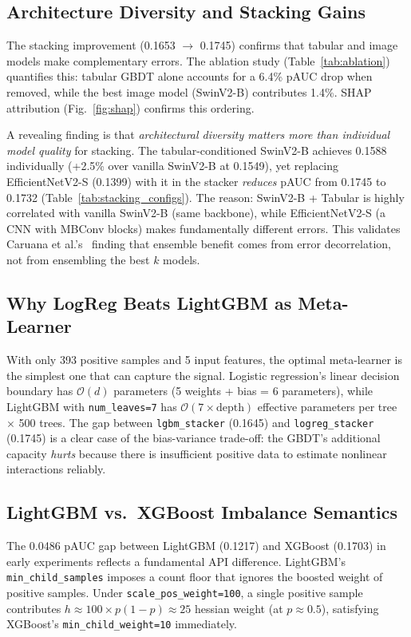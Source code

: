 \documentclass[conference]{IEEEtran}
\begin{document}
\subsection{Architecture Diversity and Stacking Gains}

The stacking improvement (0.1653 $\to$ 0.1745) confirms that
tabular and image models make complementary errors.
The ablation study (Table~\ref{tab:ablation}) quantifies this:
tabular GBDT alone accounts for a 6.4\% pAUC drop when removed,
while the best image model (SwinV2-B) contributes 1.4\%.
SHAP attribution (Fig.~\ref{fig:shap}) confirms this ordering.

A revealing finding is that \emph{architectural diversity matters
more than individual model quality} for stacking.
The tabular-conditioned SwinV2-B achieves 0.1588 individually
(+2.5\% over vanilla SwinV2-B at 0.1549), yet replacing
EfficientNetV2-S (0.1399) with it in the stacker \emph{reduces}
pAUC from 0.1745 to 0.1732 (Table~\ref{tab:stacking_configs}).
The reason: SwinV2-B + Tabular is highly correlated with vanilla
SwinV2-B (same backbone), while EfficientNetV2-S (a CNN with
MBConv blocks) makes fundamentally different errors.
This validates Caruana et al.'s~\cite{caruana2004ensemble} finding
that ensemble benefit comes from error decorrelation, not from
ensembling the best $k$ models.

\subsection{Why LogReg Beats LightGBM as Meta-Learner}

With only 393 positive samples and 5 input features, the optimal
meta-learner is the simplest one that can capture the signal.
Logistic regression's linear decision boundary has
$\mathcal{O}(d)$ parameters (5 weights + bias = 6 parameters),
while LightGBM with \texttt{num\_leaves=7} has
$\mathcal{O}(7 \times \text{depth})$ effective parameters per tree
$\times$ 500 trees.
The gap between \texttt{lgbm\_stacker} (0.1645) and
\texttt{logreg\_stacker} (0.1745) is a clear case of the
bias-variance trade-off: the GBDT's additional capacity
\emph{hurts} because there is insufficient positive data to
estimate nonlinear interactions reliably.

\subsection{LightGBM vs.\ XGBoost Imbalance Semantics}

The 0.0486 pAUC gap between LightGBM (0.1217) and XGBoost (0.1703)
in early experiments reflects a fundamental API difference.
LightGBM's \texttt{min\_child\_samples} imposes a count floor that
ignores the boosted weight of positive samples.
Under \texttt{scale\_pos\_weight=100}, a single positive sample
contributes $h \approx 100 \times p(1-p) \approx 25$ hessian weight
(at $p \approx 0.5$), satisfying XGBoost's \texttt{min\_child\_weight=10}
immediately.
\end{document}
